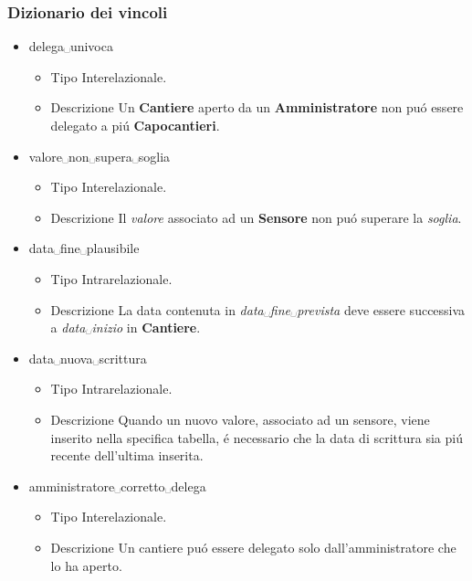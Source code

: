 \documentclass[11pt]{article}
\begin{document}
\subsubsection*{Dizionario dei vincoli}
\label{sec:org68bc11e}
\begin{itemize}
\item delega␣univoca
\label{sec:org43a7aba}
\begin{itemize}
\item Tipo
\label{sec:orgb892e21}
Interelazionale.
\item Descrizione
\label{sec:org0d15db7}
Un \textbf{Cantiere} aperto da un \textbf{Amministratore} non puó essere delegato a piú \textbf{Capocantieri}.
\end{itemize}
\item valore␣non␣supera␣soglia
\label{sec:org37ea59d}
\begin{itemize}
\item Tipo
\label{sec:org5a323d0}
Interelazionale.
\item Descrizione
\label{sec:orgfbf02c3}
Il \emph{valore} associato ad un \textbf{Sensore} non puó superare la \emph{soglia}.
\end{itemize}
\item data␣fine␣plausibile
\label{sec:orgd1a572e}
\begin{itemize}
\item Tipo
\label{sec:orge0109dd}
Intrarelazionale.
\item Descrizione
\label{sec:org8a54941}
La data contenuta in \emph{data␣fine␣prevista} deve essere successiva a \emph{data␣inizio} in \textbf{Cantiere}.
\end{itemize}
\item data␣nuova␣scrittura
\label{sec:org70599af}
\begin{itemize}
\item Tipo
\label{sec:org7c69564}
Intrarelazionale.
\item Descrizione
\label{sec:org92b0145}
Quando un nuovo valore, associato ad un sensore, viene inserito nella specifica tabella, é necessario che la data di scrittura sia piú recente dell'ultima inserita.
\end{itemize}
\item amministratore␣corretto␣delega
\label{sec:orgcdf9e2c}
\begin{itemize}
\item Tipo
\label{sec:orgf2dfa27}
Interelazionale.
\item Descrizione
\label{sec:org4ae73c6}
Un cantiere puó essere delegato solo dall'amministratore che lo ha aperto.

\end{itemize}
\end{itemize}
\end{document}
